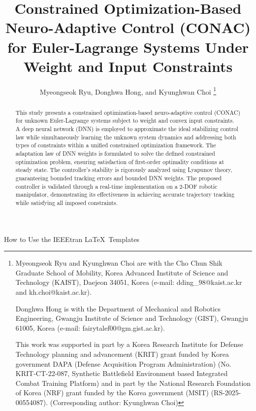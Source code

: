 \documentclass[letterpaper, journal]{IEEEtran}
\begin{document}

\title{
    Constrained Optimization-Based Neuro-Adaptive Control (CONAC) for Euler-Lagrange Systems Under Weight and Input Constraints
} %

\author{
    Myeongseok Ryu, Donghwa Hong, and Kyunghwan Choi
\thanks{
    Myeongseok Ryu and Kyunghwan Choi are with the Cho Chun Shik Graduate School of Mobility, Korea Advanced Institute of Science and Technology (KAIST), Daejeon 34051, Korea (e-mail: dding\_98@kaist.ac.kr and kh.choi@kaist.ac.kr).

    Donghwa Hong is with the Department of Mechanical and Robotics Engineering, Gwangju Institute of Science and Technology (GIST), Gwangju 61005, Korea (e-mail: fairytalef00@gm.gist.ac.kr).

    This work was supported in part by a Korea Research Institute for Defense Technology planning and advancement (KRIT) grant funded by Korea government DAPA (Defense Acquisition Program Administration) (No. KRIT-CT-22-087, Synthetic Battlefield Environment based Integrated Combat Training Platform) and in part by the National Research Foundation of Korea (NRF) grant funded by the Korea government (MSIT) (RS-2025- 00554087). (Corresponding author: Kyunghwan Choi)
    }}

%
{How to Use the IEEEtran \LaTeX \ Templates}

\maketitle

\begin{abstract}
    This study presents a constrained optimization-based neuro-adaptive control (CONAC) for unknown Euler-Lagrange systems subject to weight and convex input constraints. 
    A deep neural network (DNN) is employed to approximate the ideal stabilizing control law while simultaneously learning the unknown system dynamics and addressing both types of constraints within a unified constrained optimization framework.
    The adaptation law of DNN weights is formulated to solve the defined constrained optimization problem, ensuring satisfaction of first-order optimality conditions at steady state.
    The controller's stability is rigorously analyzed using Lyapunov theory, guaranteeing bounded tracking errors and bounded DNN weights. 
    The proposed controller is validated through a real-time implementation on a 2-DOF robotic manipulator, demonstrating its effectiveness in achieving accurate trajectory tracking while satisfying all imposed constraints.
\end{abstract}
\end{document}
